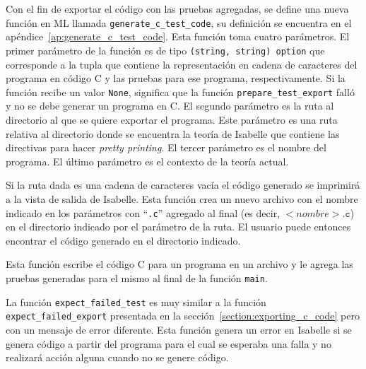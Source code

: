 Con el fin de exportar el código con las pruebas agregadas, se define una nueva función en ML llamada \verb|generate_c_test_code|, su definición se encuentra en el apéndice~\ref{ap:generate_c_test_code}.
Esta función toma cuatro parámetros.
El primer parámetro de la función es de tipo \verb|(string, string) option| que corresponde a la tupla que contiene la representación en cadena de caracteres del programa en código C y las pruebas para ese programa, respectivamente.
Si la función recibe un valor \verb|None|, significa que la función \verb|prepare_test_export| falló y no se debe generar un programa en C.
El segundo parámetro es la ruta al directorio al que se quiere exportar el programa.
Este parámetro es una ruta relativa al directorio donde se encuentra la teoría de Isabelle que contiene las directivas para hacer \textit{pretty printing}.
El tercer parámetro es el nombre del programa.
El último parámetro es el contexto de la teoría actual.

Si la ruta dada es una cadena de caracteres vacía el código generado se imprimirá a la vista de salida de Isabelle.
Esta función crea un nuevo archivo con el nombre indicado en los parámetros con ``\verb|.c|'' agregado al final (es decir, $<nombre>\mathtt{.c}$) en el directorio indicado por el parámetro de la ruta.
El usuario puede entonces encontrar el código generado en el directorio indicado.

Esta función escribe el código C para un programa en un archivo y le agrega las pruebas generadas para el mismo al final de la función \verb|main|.

La función \verb|expect_failed_test| es muy similar a la función \verb|expect_failed_export| presentada en la sección~\ref{section:exporting_c_code} pero con un mensaje de error diferente.
Esta función genera un error en Isabelle si se genera código a partir del programa para el cual se esperaba una falla y no realizará acción alguna cuando no se genere código.

